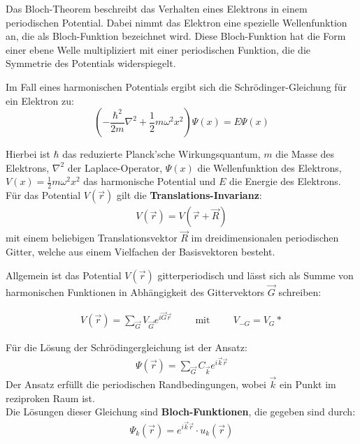 \label{q:8}

Das Bloch-Theorem beschreibt das Verhalten eines Elektrons in einem periodischen Potential. Dabei nimmt das Elektron eine spezielle Wellenfunktion an, die als Bloch-Funktion bezeichnet wird. Diese Bloch-Funktion hat die Form einer ebene Welle multipliziert mit einer periodischen Funktion, die die Symmetrie des Potentials widerspiegelt.

Im Fall eines harmonischen Potentials ergibt sich die Schrödinger-Gleichung für ein Elektron zu:
\begin{equation}
    \left(-\frac{\hbar^2}{2m} \nabla^2 + \frac{1}{2}m \omega^2 x^2\right) \Psi (x) = E \Psi(x)
\end{equation}

Hierbei ist $\hbar$ das reduzierte Planck'sche Wirkungsquantum, $m$ die Masse des Elektrons, $\nabla^2$ der Laplace-Operator, $\Psi (x)$ die Wellenfunktion des Elektrons, $V(x)=\frac{1}{2}m \omega^2 x^2$ das harmonische Potential und $E$ die Energie des Elektrons.
Für das Potential $V(\vec{r})$ gilt die \textbf{Translations-Invarianz}:
\begin{align}
    V(\vec{r}) = V(\vec{r} + \vec{R})
\end{align}
mit einem beliebigen Translationsvektor $\vec{R}$ im dreidimensionalen periodischen Gitter, welche aus einem Vielfachen der Basisvektoren besteht.

Allgemein ist das Potential $V(\vec{r})$ gitterperiodisch und lässt sich als Summe von harmonischen Funktionen in Abhängigkeit des Gittervektors $\vec{G}$ schreiben:

\begin{align}
    V(\vec{r}) = \sum_{\vec{G}} V_{\vec{G}} e^{i \vec{G} \vec{r}} \hspace{1cm} \mbox{mit} \hspace{1cm} V_{-G} = V_G*
\end{align}

Für die Lösung der Schrödingergleichung ist der Ansatz:
\begin{align}
    \Psi(\vec{r}) = \sum_{\vec{G}}  C_{\vec{k}} e^{i \vec{k} \vec{r}}
\end{align}
Der Ansatz erfüllt die periodischen Randbedingungen, wobei $\vec{k}$ ein Punkt im reziproken Raum ist. \\

Die Lösungen dieser Gleichung sind \textbf{Bloch-Funktionen}, die gegeben sind durch:
\begin{align}
    \Psi_k (\vec{r}) = e^{i\vec{k}\vec{r}} \cdot u_k(\vec{r})
\end{align}

